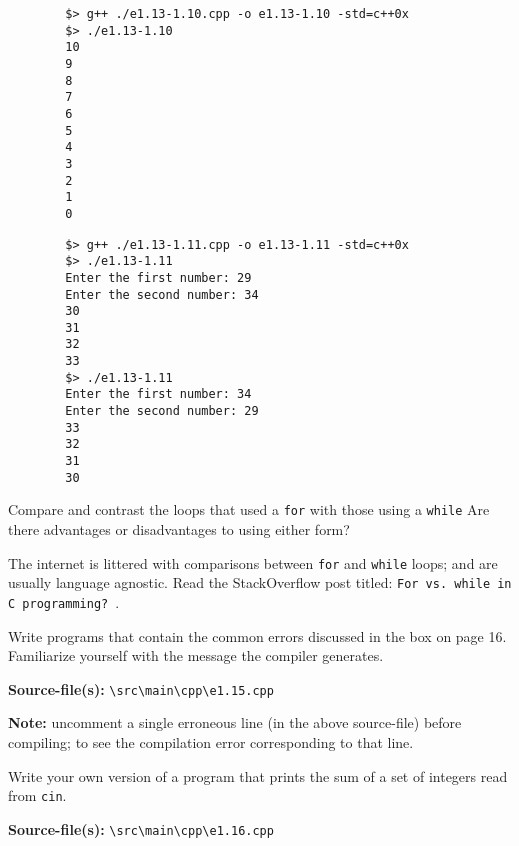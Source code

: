 \documentclass[12pt, a4paper]{article}
\begin{document}
    \begin{verbatim}
        $> g++ ./e1.13-1.10.cpp -o e1.13-1.10 -std=c++0x
        $> ./e1.13-1.10
        10
        9
        8
        7
        6
        5
        4
        3
        2
        1
        0
    \end{verbatim}

    \begin{verbatim}
        $> g++ ./e1.13-1.11.cpp -o e1.13-1.11 -std=c++0x
        $> ./e1.13-1.11
        Enter the first number: 29
        Enter the second number: 34
        30
        31
        32
        33
        $> ./e1.13-1.11
        Enter the first number: 34
        Enter the second number: 29
        33
        32
        31
        30
    \end{verbatim}

    \bigskip
    \begin{tcolorbox}[title={Exercise: 1.14}]
        Compare and contrast the loops that used a \texttt{for} with those using a \texttt{while}
        Are there advantages or disadvantages to using either form?
    \end{tcolorbox}

    \noindent The internet is littered with comparisons between \texttt{for} and \texttt{while} loops; and are usually language agnostic.
    Read the StackOverflow post titled: \texttt{For vs. while in C programming?}~\cite{stackoverflow-for-while}.

    \bigskip
    \begin{tcolorbox}[title={Exercise: 1.15}]
        Write programs that contain the common errors discussed in the box on page 16.
        Familiarize yourself with the message the compiler generates.
    \end{tcolorbox}
    \noindent\textbf{Source-file(s):} \texttt{\textbackslash src\textbackslash main\textbackslash cpp\textbackslash e1.15.cpp}

    \noindent\textbf{Note:} uncomment a single erroneous line (in the above source-file) before compiling; to see the compilation error corresponding to that line.

    \bigskip
    \begin{tcolorbox}[title={Exercise: 1.16}]
        Write your own version of a program that prints the sum of a set of integers read from \texttt{cin}.
    \end{tcolorbox}
    \noindent\textbf{Source-file(s):} \texttt{\textbackslash src\textbackslash main\textbackslash cpp\textbackslash e1.16.cpp}
\end{document}
